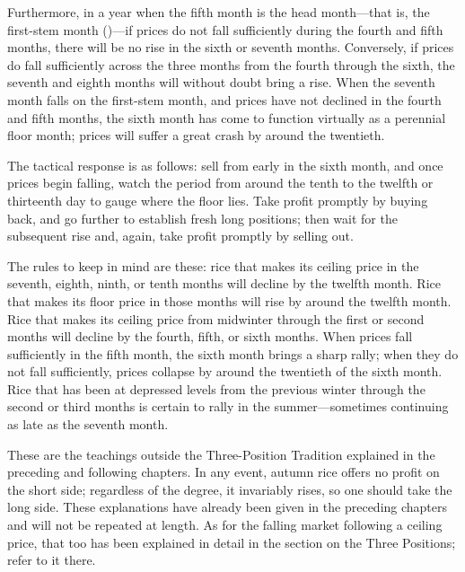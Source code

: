 Furthermore, in a year when the fifth month is the head month---that
is, the first-stem month ()---if prices do not
fall sufficiently during the fourth and fifth months, there will be no
rise in the sixth or seventh months. Conversely, if prices do fall
sufficiently across the three months from the fourth through the sixth,
the seventh and eighth months will without doubt bring a rise. When the
seventh month falls on the first-stem month, and prices have not
declined in the fourth and fifth months, the sixth month has come to
function virtually as a perennial floor month; prices will suffer a
great crash by around the twentieth.

The tactical response is as follows: sell from early in the sixth month,
and once prices begin falling, watch the period from around the tenth to
the twelfth or thirteenth day to gauge where the floor lies. Take profit
promptly by buying back, and go further to establish fresh long
positions; then wait for the subsequent rise and, again, take profit
promptly by selling out.

The rules to keep in mind are these: rice that makes its ceiling price
in the seventh, eighth, ninth, or tenth months will decline by the
twelfth month. Rice that makes its floor price in those months will rise
by around the twelfth month. Rice that makes its ceiling price from
midwinter through the first or second months will decline by the fourth,
fifth, or sixth months. When prices fall sufficiently in the fifth
month, the sixth month brings a sharp rally; when they do not fall
sufficiently, prices collapse by around the twentieth of the sixth
month. Rice that has been at depressed levels from the previous winter
through the second or third months is certain to rally in the
summer---sometimes continuing as late as the seventh month.

These are the teachings outside the Three-Position Tradition explained
in the preceding and following chapters. In any event, autumn rice
offers no profit on the short side; regardless of the degree, it
invariably rises, so one should take the long side. These explanations
have already been given in the preceding chapters and will not be
repeated at length. As for the falling market following a ceiling price,
that too has been explained in detail in the section on the Three
Positions; refer to it there.


